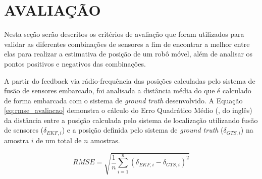 \documentclass[acronym, symbols, table, deposito]{fei}
\begin{document}
%		
%		
%		
		
	\section{AVALIAÇÃO}\label{sec:metodologia_avaliacao}
	
		Nesta seção serão descritos os critérios de avaliação que foram utilizados para validar as diferentes combinações de sensores a fim de encontrar a melhor entre elas para realizar a estimativa de posição de um robô móvel, além de analisar os pontos positivos e negativos das combinações.
		
		A partir do feedback via rádio-frequência das posições calculadas pelo sistema de fusão de sensores embarcado, foi analisada a distância média do que é calculado de forma embarcada com o sistema de \textit{ground truth} desenvolvido. A Equação \eqref{eq:rmse_avaliacao} demonstra o cálculo do Erro Quadrático Médio (, do inglês) da distância entre a posição calculada pelo sistema de localização utilizando fusão de sensores ($\delta_{EKF, i}$) e a posição definida pelo sistema de \textit{ground truth} ($\delta_{GTS, i}$) na amostra $i$ de um total de $n$ amostras.
		
		\begin{equation}\label{eq:rmse_avaliacao}
			RMSE = \sqrt{\frac{1}{n}\sum_{i=1}^{n}(\delta_{EKF, i} - \delta_{GTS, i})^{2}}
		\end{equation}
	
\end{document}

